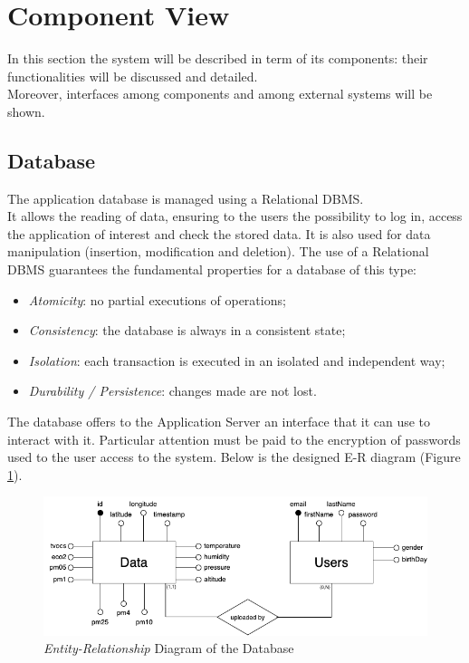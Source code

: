 \section{Component View}
In this section the system will be described in term of its components:  their functionalities will be discussed and detailed.\\
Moreover, interfaces among components and among external systems will be shown.

\subsection{Database}
The application database is managed using a Relational DBMS. \\
It allows the reading of data, ensuring to the users the possibility to log in, access the application of interest and check the stored data.
It is also used for data manipulation (insertion, modification and deletion).
The use of a Relational DBMS guarantees the fundamental properties for a database of this type:
\begin{itemize}
  \item \textit{Atomicity}: no partial executions of operations;
  \item \textit{Consistency}: the database is always in a consistent state;
  \item \textit{Isolation}: each transaction is executed in an isolated and independent way;
  \item \textit{Durability / Persistence}: changes made are not lost.
\end{itemize}

The database offers to the Application Server an interface that it can use to interact with it.
Particular attention must be paid to the encryption of passwords used to the user access to the system.
Below is the designed E-R diagram (Figure \ref{img:archi_er}).

\begin{figure}[H]
\begin{center}
  \includegraphics[width=\textwidth]{img/archi/ER.png}
  \hspace{0.05\linewidth}
  \centering
  \caption{\textit{Entity-Relationship} Diagram of the Database}
  \label{img:archi_er}
\end{center}
\end{figure}

